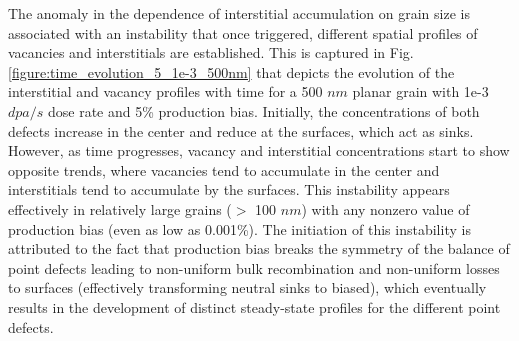 \documentclass[utf8]{frontiersSCNS} %
\begin{document}
    The anomaly in the dependence of interstitial accumulation on grain size is associated with an instability that once triggered, different spatial profiles of vacancies and interstitials are established. This is captured in Fig. \ref{figure:time_evolution_5_1e-3_500nm} that depicts the evolution of the interstitial and vacancy profiles with time for a 500 $nm$ planar grain with 1e-3 $dpa/s$ dose rate and 5\% production bias. Initially, the concentrations of both defects increase in the center and reduce at the surfaces, which act as sinks. However, as time progresses, vacancy and interstitial concentrations start to show opposite trends, where vacancies tend to accumulate in the center and interstitials tend to accumulate by the surfaces. This instability appears effectively in relatively large grains ($>$ 100 $nm$) with any nonzero value of production bias (even as low as 0.001\%). The initiation of this instability is attributed to the fact that production bias breaks the symmetry of the balance of point defects leading to non-uniform bulk recombination and non-uniform losses to surfaces (effectively transforming neutral sinks to biased), which eventually results in the development of distinct steady-state profiles for the different point defects.
    
\end{document}
